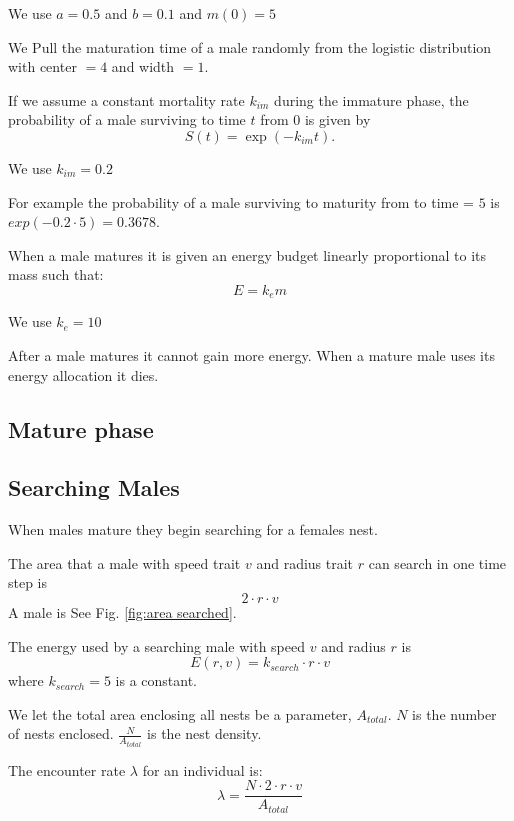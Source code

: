 \documentclass[a4paper,11pt]{article}
\begin{document}
We use $a = 0.5$ and $b = 0.1$ and $m(0) = 5$


We Pull the maturation time of a male randomly from the logistic distribution with center $= 4$ and width $= 1$.

If we assume a constant mortality rate $k_{im}$ during the immature phase, the probability of a male surviving to time $t$ from $0$ is given by
\begin{equation} \label{eq:surv_immature}
    S(t) = \exp(-k_{im} t).
\end{equation}

We use $k_{im} = 0.2$

For example the probability of a male surviving to maturity from to time = $5$ is $exp(-0.2 \cdot 5)= 0.3678$.


When a male matures it is given an energy budget linearly proportional to its mass such that: 
$$ E = k_em$$

We use $k_e = 10$

After a male matures it cannot gain more energy. When a mature male uses its energy allocation it dies.



\subsection{Mature phase}
\subsection{Searching Males}
When males mature they begin searching for a females nest.


The area that a male with speed trait $v$ and radius trait $r$ can search in one time step is
\begin{equation}
    2 \cdot r \cdot v
\end{equation}
A male is 
See Fig. \ref{fig:area searched}.

The energy used by a searching male with speed $v$ and radius $r$ is 
\begin{equation}
    E(r,v) = k_{search} \cdot r \cdot v
\end{equation}
where $k_{search} = 5$ is a constant.  %

We let the total area enclosing all nests be a parameter, $A_{total}$.
$N$ is the number of nests enclosed. $\frac{N}{A_{total}}$ is the nest density.

The encounter rate $\lambda$ for an individual is:
\begin{equation} \label{eq:encounter rate}
    \lambda = \frac {N \cdot 2 \cdot r \cdot v} {A_{total}}
\end{equation}
\citep{Gurarie2012}
\end{document}

